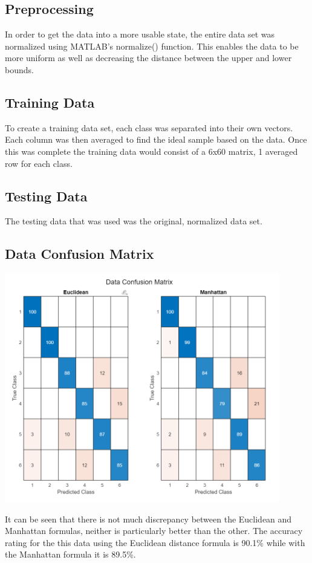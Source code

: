 \documentclass{article}
\begin{document}
\subsection{Preprocessing}

In order to get the data into a more usable state, the entire data set was
normalized using MATLAB's normalize() function.  This enables the data to 
be more uniform as well as decreasing the distance between the upper and 
lower bounds.

\subsection{Training Data}
To create a training data set, each class was separated into their own vectors.
Each column was then averaged to find the ideal sample based on the data.  Once 
this was complete the training data would consist of a 6x60 matrix, 1 averaged
row for each class.

\subsection{Testing Data}
The testing data that was used was the original, normalized data set.

\subsection{Data Confusion Matrix}
\begin{center}
    {\includegraphics[height=10cm]{graphics/confuseddata.png}\centering}
\end{center}    
It can be seen that there is not much discrepancy between the Euclidean 
and Manhattan formulas, neither is particularly better than the other.
The accuracy rating for the this data using the Euclidean distance formula
is 90.1\% while with the Manhattan formula it is 89.5\%.
\end{document}
